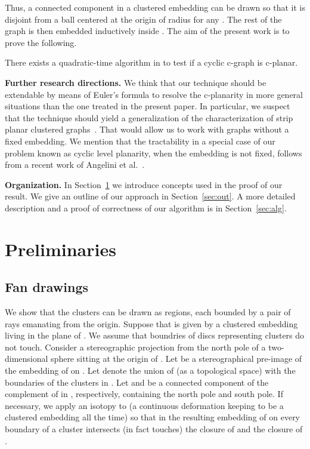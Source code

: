 \documentclass{llncs}
\newif\iflong
\begin{document}
Thus, a connected component in a clustered embedding 
can be drawn so that it is disjoint from a ball  centered at the origin of radius 
for any . The rest of the graph is then embedded inductively inside .
The aim of the present work is to prove the following.

\begin{theorem}
There exists a quadratic-time algorithm in  to test if a cyclic c-graph  is c-planar.
\end{theorem}




{\bf Further research directions.}
We think that our technique should be extendable by means of Euler's formula to resolve the c-planarity in more general situations than the one treated in the present paper. In particular, we suspect that
the technique should yield a generalization of the characterization of strip planar clustered graphs~\cite[Section 5]{F14+}. 
That would allow us to work with graphs without a fixed embedding. We mention that the tractability in a special case 
of our problem known as cyclic level planarity, when the embedding is not fixed, follows from a recent work of Angelini et al.~\cite{angelini2015beyond}.


{\bf Organization.} In Section~\ref{sec:pre} we introduce concepts used in the proof of
our result. We give an outline of our approach in Section~\ref{sec:out}.
A more detailed description and a proof of correctness of our algorithm is in Section~\ref{sec:alg}.



 
\section{Preliminaries}
\label{sec:pre}

\iflong
\subsection{Fan drawings}
\label{sec:fan}
We show that the clusters can be drawn as regions, each bounded by a pair of rays emanating from the origin.
Suppose that  is given by a clustered embedding
living in the  plane of .
We assume that boundries of discs representing clusters do not touch.
Consider a stereographic projection from the north pole of a two-dimensional sphere  
sitting at the origin of .
Let  be a stereographical pre-image of the embedding of  on .
Let  denote the union of  (as a topological space) with the boundaries of the clusters in .
Let  and  be a connected component of the complement of  in , respectively, containing the north pole and south pole.
If necessary, we apply an isotopy  to  (a continuous deformation keeping  to be a clustered embedding all the time)  so that in the resulting embedding  of  on  every boundary of a cluster intersects (in fact touches) the closure of  and  the closure of . 
\end{document}
